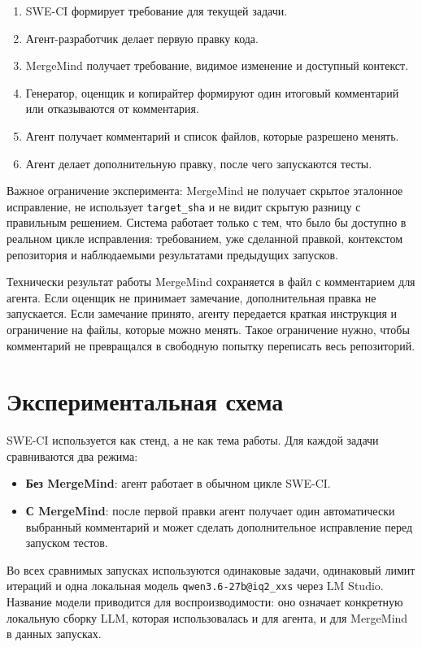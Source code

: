 \documentclass[12pt,a4paper]{article}
\begin{document}
\begin{enumerate}
  \item SWE-CI формирует требование для текущей задачи.
  \item Агент-разработчик делает первую правку кода.
  \item MergeMind получает требование, видимое изменение и доступный контекст.
  \item Генератор, оценщик и копирайтер формируют один итоговый комментарий или
  отказываются от комментария.
  \item Агент получает комментарий и список файлов, которые разрешено менять.
  \item Агент делает дополнительную правку, после чего запускаются тесты.
\end{enumerate}

Важное ограничение эксперимента: MergeMind не получает скрытое эталонное
исправление, не использует \texttt{target\_sha} и не видит скрытую разницу с
правильным решением. Система работает только с тем, что было бы доступно в
реальном цикле исправления: требованием, уже сделанной правкой, контекстом
репозитория и наблюдаемыми результатами предыдущих запусков.

Технически результат работы MergeMind сохраняется в файл с комментарием для
агента. Если оценщик не принимает замечание, дополнительная правка не
запускается. Если замечание принято, агенту передается краткая инструкция и
ограничение на файлы, которые можно менять. Такое ограничение нужно, чтобы
комментарий не превращался в свободную попытку переписать весь репозиторий.

\section{Экспериментальная схема}

SWE-CI используется как стенд, а не как тема работы. Для каждой задачи
сравниваются два режима:

\begin{itemize}
  \item \textbf{Без MergeMind}: агент работает в обычном цикле SWE-CI.
  \item \textbf{С MergeMind}: после первой правки агент получает один
  автоматически выбранный комментарий и может сделать дополнительное исправление
  перед запуском тестов.
\end{itemize}

Во всех сравнимых запусках используются одинаковые задачи, одинаковый лимит
итераций и одна локальная модель \texttt{qwen3.6-27b@iq2\_xxs} через LM Studio.
Название модели приводится для воспроизводимости: оно означает конкретную
локальную сборку LLM, которая использовалась и для агента, и для MergeMind в
данных запусках.
\end{document}
